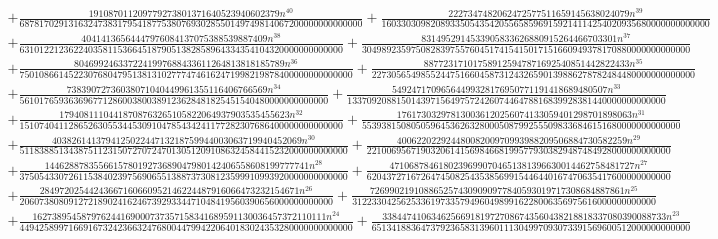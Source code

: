 \documentclass[11pt,a4paper]{article}
\theoremstyle{plain}
\theoremstyle{definition}
\begin{document}
\begin{multline*}
+ \frac{191087011209779273801371640523940602379 n^{40}}{6878170291316324738317954187753807693028550149749814067200000000000000} + \frac{2227347482062472577511659145638024079 n^{39}}{1603303098208933505435420556585969159214114254020935680000000000000} \\
+ \frac{40414136564447976084137075388539887409 n^{38}}{631012212362240358115366451879051382858964334354104320000000000000} + \frac{8314952914533905833626880915264466703301 n^{37}}{3049892359750828397557604517415415017151660949378170880000000000000} \\
+ \frac{8046992463372241997688433611264813818185789 n^{36}}{75010866145223076804795138131027774746162471998219878400000000000000} + \frac{887723171017589125947871692540851442822433 n^{35}}{227305654985524475166045873124326590139886278782484480000000000000} \\
+ \frac{73839072736038071040449961355116406766569 n^{34}}{561017659363696771286003800389123628481825451540480000000000000} + \frac{54924717096564499328176950771191418689480507 n^{33}}{13370920881501439715649757242607446478816839928381440000000000000} \\
+ \frac{17940811104418708763265105822064937903535455623 n^{32}}{151074041128652630553445309104785434241177282307686400000000000000} + \frac{176173032978130036120256074133059401298701898063 n^{31}}{55393815080505964536263280005087992555098336846151680000000000000} \\
+ \frac{403826141379412502244713218759944003063719940452069 n^{30}}{5118388513438751123150727072470130512091086324584415232000000000000} + \frac{40062202292448008200970993988209506884730582259 n^{29}}{22100695671903206141569846681995779303829487484928000000000000} \\
+ \frac{144628878355661578019273689047980142406558608199777741 n^{28}}{3750543307261153840239756906551388737308123599910993920000000000000} + \frac{47106878461802396990704651381396630014462758481727 n^{27}}{62043727167264745082543538569915446440167470635417600000000000} \\
+ \frac{28497202544243667160660952146224487916066473232154671 n^{26}}{2060738080912721890241624673929334471048419560390656000000000000} + \frac{7269902191088652574309090977840593019717308684887861 n^{25}}{31223304256253361973357949604989916228006356975616000000000000} \\
+ \frac{162738954587976244169000737357158341689591130036457372110111 n^{24}}{44942589971669167324236632476800447994220640183024353280000000000000} + \frac{3384474106346256691819727086743560438218818337080390088733 n^{23}}{65134188364737923658313960111304997093073391569600512000000000000} \\

\end{multline*}
\end{document}
